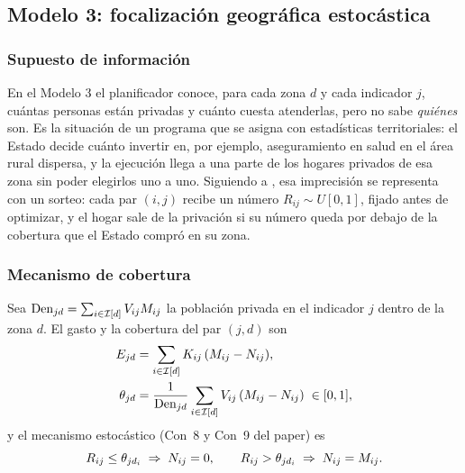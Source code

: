 \subsection{Modelo 3: focalización geográfica estocástica}\label{sec:m3}

\subsubsection{Supuesto de información}

En el Modelo 3 el planificador conoce, para cada zona $d$ y cada indicador $j$,
cuántas personas están privadas y cuánto cuesta atenderlas, pero no sabe
\emph{quiénes} son. Es la situación de un programa que se asigna con estadísticas
territoriales: el Estado decide cuánto invertir en, por ejemplo, aseguramiento en
salud en el área rural dispersa, y la ejecución llega a una parte de los hogares
privados de esa zona sin poder elegirlos uno a uno. Siguiendo a
\citet{hamie2024}, esa imprecisión se representa con un sorteo: cada par
$(i,j)$ recibe un número $R_{ij}\sim U[0,1]$, fijado antes de optimizar, y el
hogar sale de la privación si su número queda por debajo de la cobertura que el
Estado compró en su zona.

\subsubsection{Mecanismo de cobertura}

Sea $\mathrm{Den}_{jd}=\sum_{i\in\mathcal{I}[d]} V_{ij}M_{ij}$ la población privada en
el indicador $j$ dentro de la zona $d$. El gasto y la cobertura del par $(j,d)$
son
\begin{align}
E_{jd} &= \sum_{i\in\mathcal{I}[d]} K_{ij}\,(M_{ij}-N_{ij}),
  \label{eq:m3-gasto}\\
\theta_{jd} &= \frac{1}{\mathrm{Den}_{jd}}\sum_{i\in\mathcal{I}[d]} V_{ij}\,(M_{ij}-N_{ij})
  \;\in[0,1], \label{eq:m3-cobertura}
\end{align}
y el mecanismo estocástico (Con~8 y Con~9 del paper) es
\begin{equation}\label{eq:m3-sorteo}
R_{ij}\le \theta_{jd_i} \;\Rightarrow\; N_{ij}=0,
\qquad
R_{ij}> \theta_{jd_i} \;\Rightarrow\; N_{ij}=M_{ij}.
\end{equation}

